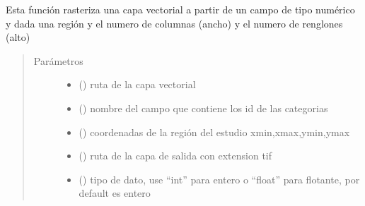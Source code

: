 \documentclass[letterpaper,10pt,spanish]{sphinxmanual}
\begin{document}

\begin{fulllineitems}
\label{\detokenize{apcsig:apcsig.rasterizar_vector}}
Esta función rasteriza una capa vectorial a partir de un campo de tipo numérico y dada una región 
y el numero de columnas (ancho) y el numero de renglones (alto)
\begin{quote}\begin{description}
\item[{Parámetros}] \leavevmode\begin{itemize}
\item {} 
 () \textendash{} ruta de la capa vectorial

\item {} 
 () \textendash{} nombre del campo que contiene los id de las categorias

\item {} 
 () \textendash{} coordenadas de la región del estudio  xmin,xmax,ymin,ymax

\item {} 
 () \textendash{} ruta de la capa de salida con extension tif

\item {} 
 () \textendash{} tipo de dato, use “int” para entero o “float” para flotante, por default es entero

\end{itemize}

\end{description}\end{quote}

\end{fulllineitems}
\end{document}
